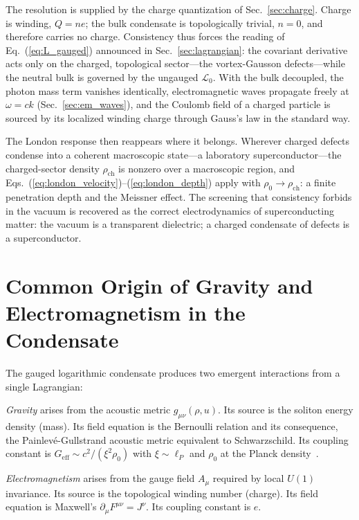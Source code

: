 \documentclass[12pt, a4paper]{article}
\newcommand{\Geff}{G_{\mathrm{eff}}}
\begin{document}
The resolution is supplied by the charge quantization of Sec.~\ref{sec:charge}. Charge is winding, $Q = ne$; the bulk condensate is topologically trivial, $n = 0$, and therefore carries no charge. Consistency thus forces the reading of Eq.~(\ref{eq:L_gauged}) announced in Sec.~\ref{sec:lagrangian}: the covariant derivative acts only on the charged, topological sector---the vortex-Gausson defects---while the neutral bulk is governed by the ungauged $\mathcal{L}_0$. With the bulk decoupled, the photon mass term vanishes identically, electromagnetic waves propagate freely at $\omega = ck$ (Sec.~\ref{sec:em_waves}), and the Coulomb field of a charged particle is sourced by its localized winding charge through Gauss's law in the standard way.

The London response then reappears where it belongs. Wherever charged defects condense into a coherent macroscopic state---a laboratory superconductor---the charged-sector density $\rho_{\mathrm{ch}}$ is nonzero over a macroscopic region, and Eqs.~(\ref{eq:london_velocity})--(\ref{eq:london_depth}) apply with $\rho_0 \to \rho_{\mathrm{ch}}$: a finite penetration depth and the Meissner effect. The screening that consistency forbids in the vacuum is recovered as the correct electrodynamics of superconducting matter: the vacuum is a transparent dielectric; a charged condensate of defects is a superconductor.


\section{Common Origin of Gravity and Electromagnetism in the Condensate}
\label{sec:common_origin}

The gauged logarithmic condensate produces two emergent interactions from a single Lagrangian:

\emph{Gravity} arises from the acoustic metric $g_{\mu\nu}(\rho, u)$. Its source is the soliton energy density (mass). Its field equation is the Bernoulli relation and its consequence, the Painlev\'{e}-Gullstrand acoustic metric equivalent to Schwarzschild. Its coupling constant is $\Geff \sim c^2/(\xi^2\rho_0)$ with $\xi \sim \ell_P$ and $\rho_0$ at the Planck density~\cite{kulangiev_2026b,kulangiev_2026e}.

\emph{Electromagnetism} arises from the gauge field $A_\mu$ required by local $U(1)$ invariance. Its source is the topological winding number (charge). Its field equation is Maxwell's $\partial_\mu F^{\mu\nu} = J^\nu$. Its coupling constant is $e$.
\end{document}
